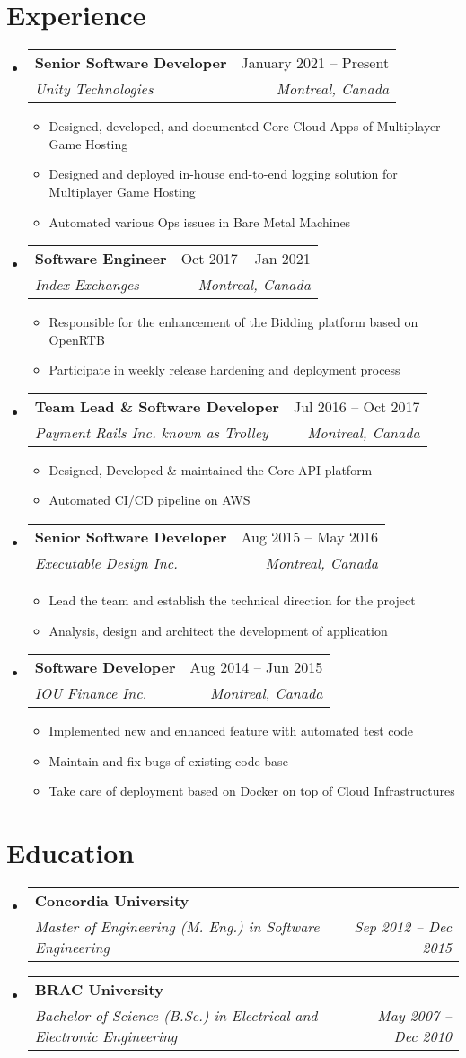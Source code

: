 \documentclass[a4paper,11pt]{article}
\makeatletter
\newcommand{\resumeItem}[1]{
  \item\small{#1}
}
\newcommand{\resumeItemListStart}{\begin{itemize}[rightmargin=0.11in]}
\newcommand{\resumeItemListEnd}{\end{itemize}}
\newcommand{\resumeQuadHeading}[4]{
  \item
  \begin{tabular*}{0.96\textwidth}[t]{l@{\extracolsep{\fill}}r}
    \textbf{#1} & #2 \\
    \textit{\small#3} & \textit{\small #4} \\
  \end{tabular*}
}
\newcommand{\resumeHeadingListStart}{
  \begin{itemize}[leftmargin=0.15in, label={}]
}
\newcommand{\resumeHeadingListEnd}{\end{itemize}}
\makeatother
\begin{document}
\section{Experience}
\resumeHeadingListStart{}
  \resumeQuadHeading{Senior Software Developer}{January 2021 -- Present}
  {Unity Technologies}{Montreal, Canada}
    \resumeItemListStart{}
      \resumeItem{Designed, developed, and documented Core Cloud Apps of Multiplayer Game Hosting}
      \resumeItem{Designed and deployed in-house end-to-end logging solution for Multiplayer Game Hosting }
      \resumeItem{Automated various Ops issues in Bare Metal Machines}
    \resumeItemListEnd{}

  \resumeQuadHeading{Software Engineer}{Oct 2017 -- Jan 2021}
  {Index Exchanges}{Montreal, Canada}
    \resumeItemListStart{}
      \resumeItem{Responsible for the enhancement of the Bidding platform based on OpenRTB  }
      \resumeItem{Participate in weekly release hardening and deployment process }
    \resumeItemListEnd{}

  \resumeQuadHeading{Team Lead \& Software Developer}{Jul 2016 -- Oct 2017}
  {Payment Rails Inc. known as Trolley}{Montreal, Canada}
    \resumeItemListStart{}
      \resumeItem{Designed, Developed \& maintained the Core API platform }
      \resumeItem{Automated CI/CD pipeline on AWS}
    \resumeItemListEnd{}
\resumeQuadHeading{Senior Software Developer}{Aug 2015 -- May 2016}
  {Executable Design Inc.}{Montreal, Canada}
    \resumeItemListStart{}
      \resumeItem{Lead the team and establish the technical direction for the project}
      \resumeItem{Analysis, design and architect the development of application}
    \resumeItemListEnd{}
\resumeQuadHeading{Software Developer}{Aug 2014 -- Jun 2015}
  {IOU Finance Inc.}{Montreal, Canada}
    \resumeItemListStart{}
      \resumeItem{Implemented new and enhanced feature with automated test code}
      \resumeItem{Maintain and fix bugs of existing code base}
      \resumeItem{Take care of deployment based on Docker on top of Cloud Infrastructures}
    \resumeItemListEnd{}
\resumeHeadingListEnd{}



\section{Education}
  \resumeHeadingListStart{}
    \resumeQuadHeading{Concordia University}{}
    {Master of Engineering (M. Eng.) in Software Engineering}{Sep 2012 -- Dec 2015}
    \resumeQuadHeading{BRAC University}{}
    {Bachelor of Science (B.Sc.) in Electrical and Electronic Engineering}{May 2007 -- Dec 2010}
  \resumeHeadingListEnd{}
\end{document}
